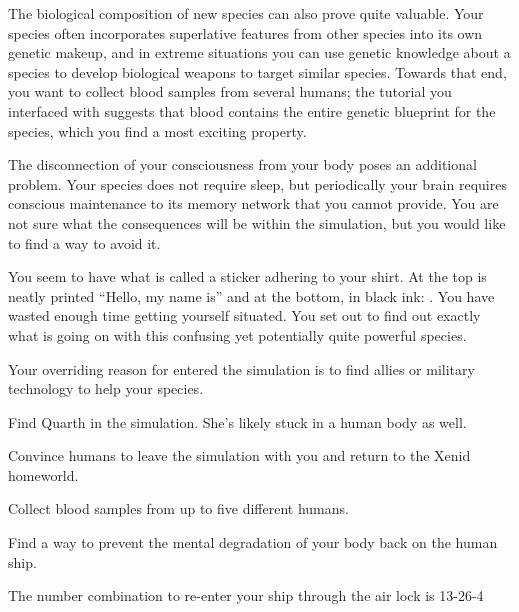 \documentclass[char]{guildcamp1}
\begin{document}
The biological composition of new species can also prove quite valuable. Your species often incorporates superlative features from other species into its own genetic makeup, and in extreme situations you can use genetic knowledge about a species to develop biological weapons to target similar species. Towards that end, you want to collect blood samples from several humans; the tutorial you interfaced with suggests that blood contains the entire genetic blueprint for the species, which you find a most exciting property.

The disconnection of your consciousness from your body poses an additional problem. Your species does not require sleep, but periodically your brain requires conscious maintenance to its memory network that you cannot provide. You are not sure what the consequences will be within the simulation, but you would like to find a way to avoid it.

You seem to have what is called a sticker adhering to your shirt. At the top is neatly printed ``Hello, my name is'' and at the bottom, in black ink: \cActive{\intro}. You have wasted enough time getting yourself situated. You set out to find out exactly what is going on with this confusing yet potentially quite powerful species.

\begin{itemz}[Goals]
  \item Your overriding reason for entered the simulation is to find allies or military technology to help your species.
  \item Find Quarth in the simulation. She's likely stuck in a human body as well.
  \item Convince humans to leave the simulation with you and return to the Xenid homeworld.
  \item Collect blood samples from up to five different humans.
  \item Find a way to prevent the mental degradation of your body back on the human ship.
\end{itemz}

\begin{itemz}[Notes]
  \item The number combination to re-enter your ship through the air lock is 13-26-4
\end{itemz}

\end{document}
